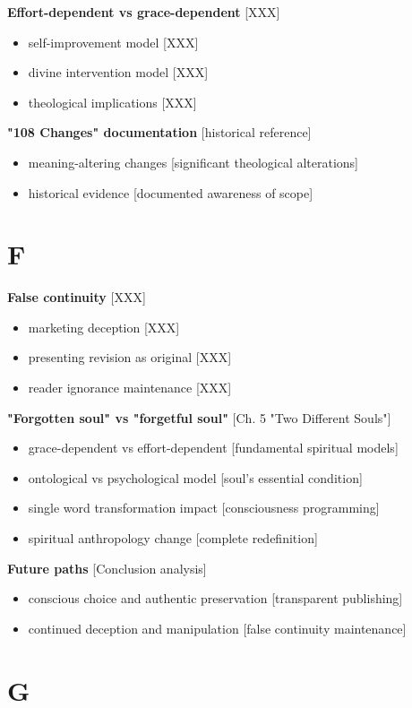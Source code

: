 \documentclass[11pt,twoside]{book}
\begin{document}
\textbf{\textbf{Effort-dependent vs grace-dependent}} {[}XXX]
\begin{itemize}
\item self-improvement model [XXX]
\item divine intervention model [XXX]
\item theological implications [XXX]
\end{itemize}

\textbf{\textbf{"108 Changes" documentation}} {[}historical reference]
\begin{itemize}
\item meaning-altering changes [significant theological alterations]
\item historical evidence [documented awareness of scope]
\end{itemize}
\section*{F}
\label{sec:org5e45bef}

\textbf{\textbf{False continuity}} {[}XXX]
\begin{itemize}
\item marketing deception [XXX]
\item presenting revision as original [XXX]
\item reader ignorance maintenance [XXX]
\end{itemize}

\textbf{\textbf{"Forgotten soul" vs "forgetful soul"}} {[}Ch. 5 "Two Different Souls"]
\begin{itemize}
\item grace-dependent vs effort-dependent [fundamental spiritual models]
\item ontological vs psychological model [soul's essential condition]
\item single word transformation impact [consciousness programming]
\item spiritual anthropology change [complete redefinition]
\end{itemize}

\textbf{\textbf{Future paths}} {[}Conclusion analysis]
\begin{itemize}
\item conscious choice and authentic preservation [transparent publishing]
\item continued deception and manipulation [false continuity maintenance]
\end{itemize}
\section*{G}
\label{sec:org26d9519}
\end{document}
